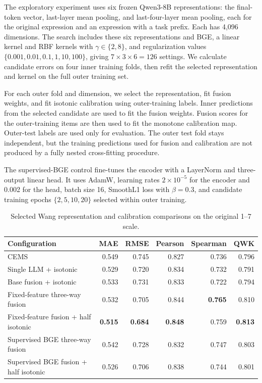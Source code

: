 The exploratory experiment uses six frozen Qwen3-8B representations: the final-token vector, last-layer mean pooling, and last-four-layer mean pooling, each for the original expression and an expression with a task prefix. Each has 4,096 dimensions. The search includes these six representations and BGE, a linear kernel and RBF kernels with $\gamma\in\{2,8\}$, and regularization values $\{0.001,0.01,0.1,1,10,100\}$, giving $7\times3\times6=126$ settings. We calculate candidate errors on four inner training folds, then refit the selected representation and kernel on the full outer training set.

For each outer fold and dimension, we select the representation, fit fusion weights, and fit isotonic calibration using outer-training labels. Inner predictions from the selected candidate are used to fit the fusion weights. Fusion scores for the outer-training items are then used to fit the monotone calibration map. Outer-test labels are used only for evaluation. The outer test fold stays independent, but the training predictions used for fusion and calibration are not produced by a fully nested cross-fitting procedure.

The supervised-BGE control fine-tunes the encoder with a LayerNorm and three-output linear head. It uses AdamW, learning rates $2\times10^{-5}$ for the encoder and 0.002 for the head, batch size 16, SmoothL1 loss with $\beta=0.3$, and candidate training epochs $\{2,5,10,20\}$ selected within outer training.

\begin{table}[t]
\centering
\footnotesize
\setlength{\tabcolsep}{5pt}
\caption{Selected Wang representation and calibration comparisons on the original 1--7 scale.}
\label{tab:wang_all_exploration}
\begin{tabular}{lrrrrr}
\toprule
Configuration & MAE & RMSE & Pearson & Spearman & QWK\\
\midrule
CEMS & 0.549 & 0.745 & 0.827 & 0.736 & 0.796\\
Single LLM + isotonic & 0.529 & 0.720 & 0.834 & 0.732 & 0.791\\
Base fusion + isotonic & 0.533 & 0.731 & 0.833 & 0.722 & 0.794\\
Fixed-feature three-way fusion & 0.532 & 0.705 & 0.844 & \textbf{0.765} & 0.810\\
Fixed-feature fusion + half isotonic & \textbf{0.515} & \textbf{0.684} & \textbf{0.848} & 0.759 & \textbf{0.813}\\
Supervised BGE three-way fusion & 0.542 & 0.728 & 0.832 & 0.747 & 0.803\\
Supervised BGE fusion + half isotonic & 0.526 & 0.706 & 0.838 & 0.744 & 0.801\\
\bottomrule
\end{tabular}
\end{table}


